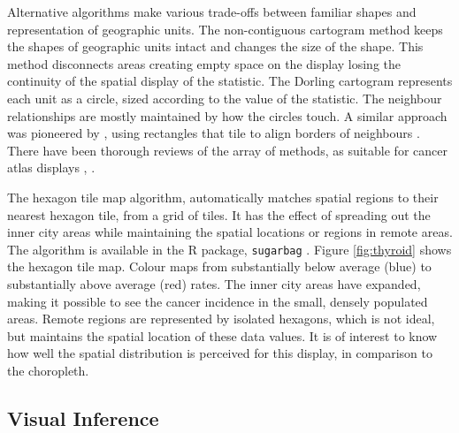 \documentclass[times, doublespace]{anzsauth}
\begin{document}
Alternative algorithms make various trade-offs between familiar shapes
and representation of geographic units. The non-contiguous cartogram
method \citep{NAC} keeps the shapes of geographic units
intact and changes the size of the shape. This method disconnects areas
creating empty space on the display losing the continuity of the spatial
display of the statistic. The Dorling cartogram
\citep{ACTUC} represents each unit as a circle, sized
according to the value of the statistic. The neighbour relationships are
mostly maintained by how the circles touch. A similar approach was
pioneered by \cite{RSCW}, using rectangles that
tile to align borders of neighbours \citep{CDWCS}.
There have been thorough reviews of the array of methods, as suitable
for cancer atlas displays \citep{review},
\citep{BCM}.





The hexagon tile map algorithm, automatically matches spatial regions to
their nearest hexagon tile, from a grid of tiles. It has the effect of
spreading out the inner city areas while maintaining the spatial
locations or regions in remote areas. The algorithm is available in the
R package,  \texttt{sugarbag} \citep{sugarbag}. Figure
\ref{fig:thyroid} shows the hexagon tile map. Colour maps from
substantially below average (blue) to substantially above average (red)
rates. The inner city areas have expanded, making it possible to see the
cancer incidence in the small, densely populated areas. Remote regions
are represented by isolated hexagons, which is not ideal, but maintains
the spatial location of these data values. It is of interest to know how
well the spatial distribution is perceived for this display, in
comparison to the choropleth.

\subsection{Visual Inference}\label{visual-inference}
\end{document}
